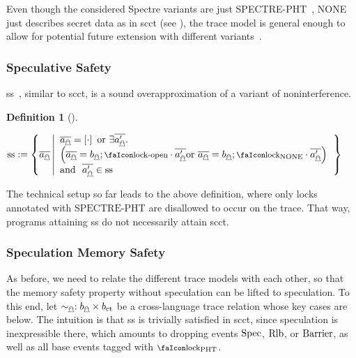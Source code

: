 \documentclass[dvipsnames,conference]{IEEEtran}
\theoremstyle{definition}
\newtheorem{definition}{Definition}[section]
\begin{document}
Even though the considered Spectre variants are just SPECTRE-PHT~\cite{kocher2019spectre}, NONE just describes secret data as in \gls*{scct} (see ), the trace model is general enough to allow for potential future extension with different variants~\cite{kocher2019spectre,maisuradze2018ret2spec,horn2019zero}.

\subsubsection{Speculative Safety}

\gls*{ss}~\cite{patrignani2021exorcising}, similar to \gls*{scct}, is a sound overapproximation of a variant of noninterference.

\begin{definition}[]\label{def:trace:ss}
  \noindent

  \begin{nscenter}
  $
    \sssafe:=\left\{\trace[_{\mathghost}] \left|\begin{array}{l}
      \trace[_{\mathghost}]=\hole{\cdot} \text{ or } \exists\trace[_{\mathghost}'].\\
      \left(\trace[_{\mathghost}]=\preevent[_{\mathghost}];\unlock\cdot\trace[_{\mathghost}'] \text{or }\trace[_{\mathghost}]=\preevent[_{\mathghost}];\lock_{\text{NONE}}\cdot\trace[_{\mathghost}']\right)\\
      \text{and }\ \trace[_{\mathghost}']\in\sssafe
                                 \end{array}\right.\right\}
  $ 
  \end{nscenter}
\end{definition}
The technical setup so far leads to the above definition, where only locks annotated with $\text{SPECTRE-PHT}$ are disallowed to occur on the trace.
That way, programs attaining \gls*{ss} do not necessarily attain \gls*{scct}.

\subsubsection{Speculation Memory Safety}

As before, we need to relate the different trace models with each other, so that the memory safety property without speculation can be lifted to speculation. 
To this end, let $\sim_{\mathghost}: \preevent[_{\mathghost}] \times \preevent[_{\ctsafe}]$ be a cross-language trace relation whose key cases are below.
The intuition is that \gls*{ss} is trivially satisfied in \gls*{scct}, since speculation is inexpressible there, which amounts to dropping events $\text{Spec}$, $\text{Rlb}$, or $\text{Barrier}$, as well as all base events tagged with $\lock_{\text{PHT}}$. 
\end{document}
